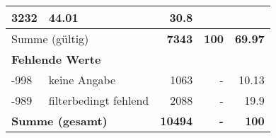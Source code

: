 \begin{longtable}{lXrrr}
       \num{3232} &
       \num[round-mode=places,round-precision=2]{44.01} &
         \num[round-mode=places,round-precision=2]{30.8} \\
     \midrule
     \multicolumn{2}{l}{Summe (gültig)} &
       \textbf{\num{7343}} &
     \textbf{\num{100}} &
       \textbf{\num[round-mode=places,round-precision=2]{69.97}} \\
     \multicolumn{5}{l}{\textbf{Fehlende Werte}}\\
       -998 &
       keine Angabe &
         \num{1063} &
        - &
         \num[round-mode=places,round-precision=2]{10.13} \\
       -989 &
       filterbedingt fehlend &
         \num{2088} &
        - &
         \num[round-mode=places,round-precision=2]{19.9} \\
     \midrule
     \multicolumn{2}{l}{\textbf{Summe (gesamt)}} &
          \textbf{\num{10494}} &
        \textbf{-} &
        \textbf{\num{100}} \\
     \bottomrule
     \end{longtable}
     

